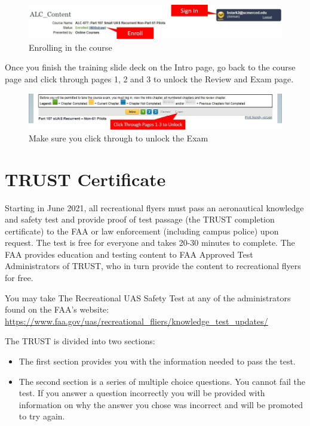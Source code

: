 \documentclass[
  12pt,
]{book}
\providecommand{\tightlist}{%
  \setlength{\itemsep}{0pt}\setlength{\parskip}{0pt}}
\begin{document}
\begin{figure}
\includegraphics[width=1\linewidth]{images/P107R-enroll} \caption{Enrolling in the course}\label{fig:p107-enroll}
\end{figure}

Once you finish the training slide deck on the Intro page, go back to the course page and click through pages 1, 2 and 3 to unlock the Review and Exam page.

\begin{figure}
\includegraphics[width=1\linewidth]{images/P107R-unlock} \caption{Make sure you click through to unlock the Exam}\label{fig:p107-unlock}
\end{figure}

\section{TRUST Certificate}\label{TRUST}

Starting in June 2021, all recreational flyers must pass an aeronautical knowledge and safety test and provide proof of test passage (the TRUST completion certificate) to the FAA or law enforcement (including campus police) upon request. The test is free for everyone and takes 20-30 minutes to complete. The FAA provides education and testing content to FAA Approved Test Administrators of TRUST, who in turn provide the content to recreational flyers for free.

You may take The Recreational UAS Safety Test at any of the administrators found on the FAA's website:
\url{https://www.faa.gov/uas/recreational_fliers/knowledge_test_updates/}

The TRUST is divided into two sections:

\begin{itemize}
\tightlist
\item
  The first section provides you with the information needed to pass the test.
\item
  The second section is a series of multiple choice questions. You cannot fail the test. If you answer a question incorrectly you will be provided with information on why the answer you chose was incorrect and will be promoted to try again.
\end{itemize}
\end{document}
